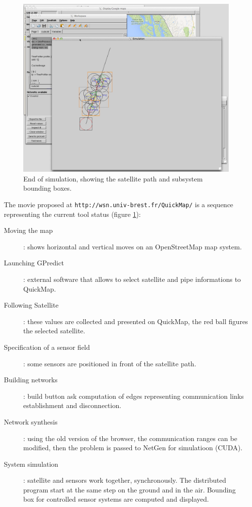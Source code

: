 \begin{figure}[hbtp]
\begin{center}
\includegraphics[width=12cm]{QuickMapDemo.png} 
\caption{End of simulation, showing the satellite path and subsystem bounding boxes.}
\label{fig:QuickMapDemo}
\end{center} 
\end{figure}

The movie proposed at  {\tt http://wsn.univ-brest.fr/QuickMap/} is a sequence representing 
the current tool status (figure \ref{fig:QuickMapDemo}):

\begin{description}
\item  [Moving the map ]: shows horizontal and vertical moves on an OpenStreetMap map system. 
\item [Launching GPredict  ]: external software that allows to select satellite and pipe informations to QuickMap. 
\item [Following Satellite ]: these values are collected and presented on QuickMap, the red ball figures the selected satellite. 
\item [Specification of a sensor field]: some sensors are positioned in front of the satellite path.
\item [Building networks ]: build button ask computation of edges representing communication links establishment and disconnection.
\item [Network synthesis ]: using the old version of the browser, the communication ranges can be modified, then the problem is passed to NetGen for simulatioon (CUDA).
\item [System simulation ]:  satellite and sensors work together, synchronously. The distributed program start at the same step
on the ground and in the air. Bounding box for controlled sensor systems are computed and displayed.
\end{description}

